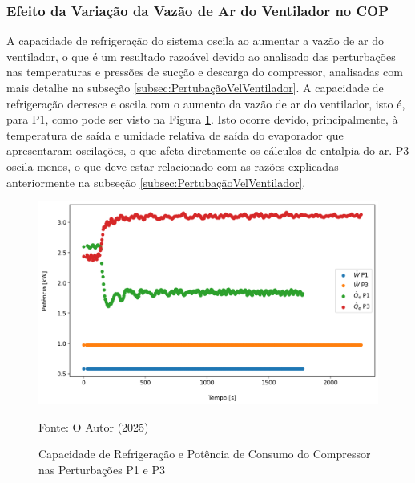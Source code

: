 \subsubsection{Efeito da Variação da Vazão de Ar do Ventilador no COP}

A capacidade de refrigeração do sistema oscila ao aumentar a vazão de ar do ventilador, o que é um resultado razoável devido ao analisado das perturbações nas temperaturas e pressões de sucção e descarga do compressor, analisadas com mais detalhe na subseção \ref{subsec:PertubaçãoVelVentilador}. A capacidade de refrigeração decresce e oscila com o aumento da vazão de ar do ventilador, isto é, para P1, como pode ser visto na Figura \ref{fig:Qe e W Perturbação Ventilador}. Isto ocorre devido, principalmente, à temperatura de saída e umidade relativa de saída do evaporador que apresentaram oscilações, o que afeta diretamente os cálculos de entalpia do ar. P3 oscila menos, o que deve estar relacionado com as razões explicadas anteriormente na subseção \ref{subsec:PertubaçãoVelVentilador}.

\begin{figure}[h]
    \centering
    \includegraphics[width=1\linewidth]{FigurasdoTexto/Qe e W Perturbação Ventilador.png}
    \caption{Capacidade de Refrigeração e Potência de Consumo do Compressor nas Perturbações P1 e P3}
    \label{fig:Qe e W Perturbação Ventilador}
    {\footnotesize Fonte: O Autor (2025)}
\end{figure}

